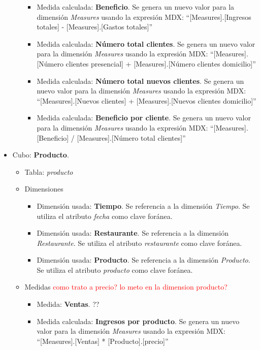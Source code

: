 \documentclass[12pt]{opticajnl}
\begin{document}
\begin{itemize}
\begin{itemize}
\begin{itemize}
\item Medida calculada: \textbf{Beneficio}. Se genera un nuevo valor para la dimensión \textit{Measures} usando la expresión MDX: ``[Measures].[Ingresos totales] - [Measures].[Gastos totales]''
\item Medida calculada: \textbf{Número total clientes}. Se genera un nuevo valor para la dimensión \textit{Measures} usando la expresión MDX: ``[Measures].[Número clientes presencial] + [Measures].[Número clientes domicilio]''
\item Medida calculada: \textbf{Número total nuevos clientes}. Se genera un nuevo valor para la dimensión \textit{Measures} usando la expresión MDX: ``[Measures].[Nuevos clientes] + [Measures].[Nuevos clientes domicilio]''
\item Medida calculada: \textbf{Beneficio por cliente}. Se genera un nuevo valor para la dimensión \textit{Measures} usando la expresión MDX: ``[Measures].[Beneficio] / [Measures].[Número total clientes]''
\end{itemize}
\end{itemize}
\item Cubo: \textbf{Producto}.
\begin{itemize}
\item Tabla: \textit{producto}
\item Dimensiones
\begin{itemize}
\item Dimensión usada: \textbf{Tiempo}. Se referencia a la dimensión \textit{Tiempo}. Se utiliza el atributo \textit{fecha} como clave foránea.
\item Dimensión usada: \textbf{Restaurante}. Se referencia a la dimensión \textit{Restaurante}. Se utiliza el atributo \textit{restaurante} como clave foránea.
\item Dimensión usada: \textbf{Producto}. Se referencia a la dimensión \textit{Producto}. Se utiliza el atributo \textit{producto} como clave foránea.
\end{itemize}
\item Medidas \textcolor{red}{como trato a precio? lo meto en la dimension producto?}
\begin{itemize}
\item Medida: \textbf{Ventas}. ??
\item Medida calculada: \textbf{Ingresos por producto}. Se genera un nuevo valor para la dimensión \textit{Measures} usando la expresión MDX: ``[Measures].[Ventas] * [Producto].[precio]''
\end{itemize}
\end{itemize}

\end{itemize}
\end{document}

